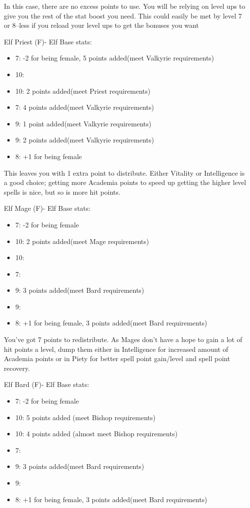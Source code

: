 \documentclass[12pt]{article}
\providecommand{\tightlist}{%
  \setlength{\itemsep}{0pt}\setlength{\parskip}{0pt}}
\begin{document}
In this case, there are no excess points to use. You will be relying on
level ups to give you the rest of the stat boost you need. This could
easily be met by level 7 or 8--less if you reload your level ups to get
the bonuses you want

Elf Priest (F)- Elf Base stats:

\begin{itemize}
\tightlist
\item
  7: -2 for being female, 5 points added(meet Valkyrie requirements)
\item
  10:
\item
  10: 2 points added(meet Priest requirements)
\item
  7: 4 points added(meet Valkyrie requirements)
\item
  9: 1 point added(meet Valkyrie requirements)
\item
  9: 2 points added(meet Valkyrie requirements)
\item
  8: +1 for being female
\end{itemize}

This leaves you with 1 extra point to distribute. Either Vitality or
Intelligence is a good choice; getting more Academia points to speed up
getting the higher level spells is nice, but so is more hit points.

Elf Mage (F)- Elf Base stats:

\begin{itemize}
\tightlist
\item
  7: -2 for being female
\item
  10: 2 points added(meet Mage requirements)
\item
  10:
\item
  7:
\item
  9: 3 points added(meet Bard requirements)
\item
  9:
\item
  8: +1 for being female, 3 points added(meet Bard requirements)
\end{itemize}

You've got 7 points to redistribute. As Mages don't have a hope to gain
a lot of hit points a level, dump them either in Intelligence for
increased amount of Academia points or in Piety for better spell point
gain/level and spell point recovery.

Elf Bard (F)- Elf Base stats:

\begin{itemize}
\tightlist
\item
  7: -2 for being female
\item
  10: 5 points added (meet Bishop requirements)
\item
  10: 4 points added (almost meet Bishop requirements)
\item
  7:
\item
  9: 3 points added(meet Bard requirements)
\item
  9:
\item
  8: +1 for being female, 3 points added(meet Bard requirements)
\end{itemize}
\end{document}
